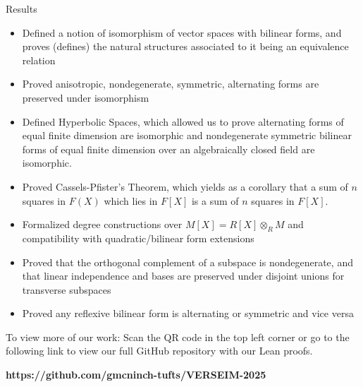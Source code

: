 \documentclass[final]{beamer}
\newlength{\colwidth}
\begin{document}
\begin{frame}[t]
\begin{columns}[t]
\begin{column}{\colwidth}
\begin{exampleblock}{{\LARGE Results}}
\begin{itemize}
    \item {\large Defined a notion of isomorphism of vector spaces with bilinear forms, and proves (defines) the natural structures associated to it being an equivalence relation}
    \item {\large Proved anisotropic, nondegenerate, symmetric, alternating forms are preserved under isomorphism}
    \item {\large Defined Hyperbolic Spaces, which allowed us to prove alternating forms of equal finite dimension are isomorphic and nondegenerate symmetric bilinear forms of equal finite dimension over an algebraically closed field are isomorphic.}
    \item {\large Proved Cassels-Pfister's Theorem, which yields as a corollary that a sum of $n$ squares in $F(X)$ which lies in $F[X]$ is a sum of $n$ squares in $F[X]$.} 
    \item {\large Formalized degree constructions over $M[X] = R[X] \otimes_R M$ and compatibility with quadratic/bilinear form extensions}
    \item {\large Proved that the orthogonal complement of a subspace is nondegenerate, and that linear independence and bases are preserved under disjoint unions for transverse subspaces}    
    \item {\large Proved any reflexive bilinear form is alternating or symmetric and vice versa}
\end{itemize}

\end{exampleblock}

{\onehalfspacing
\begin{alertblock}{{\LARGE To view more of our work:}}
Scan the QR code in the top left corner or go to the following link to view our full GitHub repository with our Lean proofs.

\textbf{https://github.com/gmcninch-tufts/VERSEIM-2025}
\end{alertblock}
}

\end{column}


\end{columns}
\end{frame}
\end{document}
